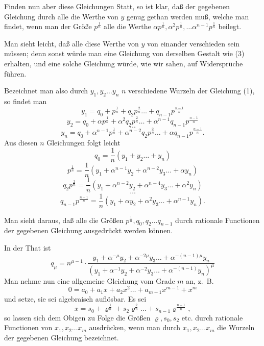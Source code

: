 \documentclass{article}
\begin{document}
Finden nun aber diese Gleichungen Statt, so ist klar, daß der gegebenen Gleichung durch alle die Werthe von $y$ genug gethan werden muß, welche man findet, wenn man der Größe $p^{\frac{1}{n}}$ alle die Werthe $\alpha p^{\frac{1}{n}}, \alpha^{2} p^{\frac{1}{n}}, \ldots \alpha^{n-1} p^{\frac{1}{n}}$ beilegt.

Man sieht leicht, daß alle diese Werthe von $y$ von einander verschieden sein müssen; denn sonst würde man eine Gleichung von derselben Gestalt wie (3) erhalten, und eine solche Gleichung würde, wie wir sahen, auf Widersprüche führen.

Bezeichnet man also durch $y_1, y_2 \ldots y_n$ $n$ verschiedene Wurzeln der Gleichung (1), so findet man
\[ y_1 = q_0 + p^{\frac{1}{n}} + q_2 p^{\frac{2}{n}} \ldots + q_{n-1} p^{\frac{n-1}{n}} \]
\[ y_2 = q_0 + \alpha p^{\frac{1}{n}} + \alpha^{2} q_2 p^{\frac{2}{n}} \ldots + \alpha^{n-1} q_{n-1} p^{\frac{n-1}{n}} \]
\[ \ldots \]
\[ y_n = q_0 + \alpha^{n-1} p^{\frac{1}{n}} + \alpha^{n-2} q_2 p^{\frac{2}{n}} \ldots + \alpha q_{n-1} p^{\frac{n-1}{n}}. \]
Aus diesen $n$ Gleichungen folgt leicht
\[ q_0 = \frac{1}{n}(y_1 + y_2 \ldots + y_n) \]
\[ p^{\frac{1}{n}} = \frac{1}{n}(y_1 + \alpha^{n-1} y_2 + \alpha^{n-2} y_3 \ldots + \alpha y_n) \]
\[ q_2 p^{\frac{2}{n}} = \frac{1}{n}(y_1 + \alpha^{n-2} y_2 + \alpha^{n-4} y_3 \ldots + \alpha^{2} y_n) \]
\[ \ldots \]
\[ q_{n-1} p^{\frac{n-1}{n}} = \frac{1}{n}(y_1 + \alpha y_2 + \alpha^{2} y_3 \ldots + \alpha^{n-1} y_n). \]

Man sieht daraus, daß alle die Größen $p^{\frac{1}{n}}, q_0, q_2 \ldots q_{n-1}$ durch rationale Functionen der gegebenen Gleichung ausgedrückt werden können.

In der That ist
\[ q_\mu = n^{\mu-1} \cdot \frac{y_1 + \alpha^{-\mu} y_2 + \alpha^{-2\mu} y_3 \ldots + \alpha^{-(n-1)\mu} y_n}{(y_1 + \alpha^{-1} y_2 + \alpha^{-2} y_3 \ldots + \alpha^{-(n-1)} y_n)^{\mu}} \]
Man nehme nun eine allgemeine Gleichung vom Grade $m$ an, z.\ B.
\[ 0 = a_0 + a_1 x + a_2 x^{2} \ldots + a_{m-1} x^{m-1} + x^{m} \]
und setze, sie sei algebraisch auflösbar. Es sei
\[ x = s_0 + \varrho^{\frac{1}{n}} + s_2 \varrho^{\frac{2}{n}} \ldots + s_{n-1} \varrho^{\frac{n-1}{n}}, \]
so lassen sich dem Obigen zu Folge die Größen $\varrho, s_0, s_2$ etc. durch rationale Functionen von $x_1, x_2 \ldots x_m$ ausdrücken, wenn man durch $x_1, x_2 \ldots x_m$ die Wurzeln der gegebenen Gleichung bezeichnet.
\end{document}
